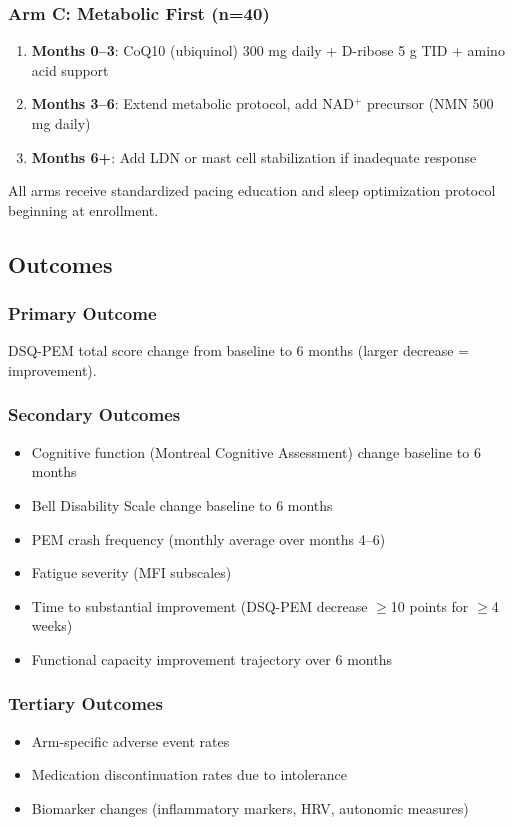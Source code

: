 \subsubsection{Arm C: Metabolic First (n=40)}
\begin{enumerate}
    \item \textbf{Months 0--3}: CoQ10 (ubiquinol) 300 mg daily + D-ribose 5 g TID + amino acid support
    \item \textbf{Months 3--6}: Extend metabolic protocol, add NAD$^+$ precursor (NMN 500 mg daily)
    \item \textbf{Months 6+}: Add LDN or mast cell stabilization if inadequate response
\end{enumerate}

All arms receive standardized pacing education and sleep optimization protocol beginning at enrollment.

\subsection{Outcomes}

\subsubsection{Primary Outcome}
DSQ-PEM total score change from baseline to 6 months (larger decrease = improvement).

\subsubsection{Secondary Outcomes}
\begin{itemize}
    \item Cognitive function (Montreal Cognitive Assessment) change baseline to 6 months
    \item Bell Disability Scale change baseline to 6 months
    \item PEM crash frequency (monthly average over months 4--6)
    \item Fatigue severity (MFI subscales)
    \item Time to substantial improvement (DSQ-PEM decrease $\geq$10 points for $\geq$4 weeks)
    \item Functional capacity improvement trajectory over 6 months
\end{itemize}

\subsubsection{Tertiary Outcomes}
\begin{itemize}
    \item Arm-specific adverse event rates
    \item Medication discontinuation rates due to intolerance
    \item Biomarker changes (inflammatory markers, HRV, autonomic measures)
\end{itemize}

